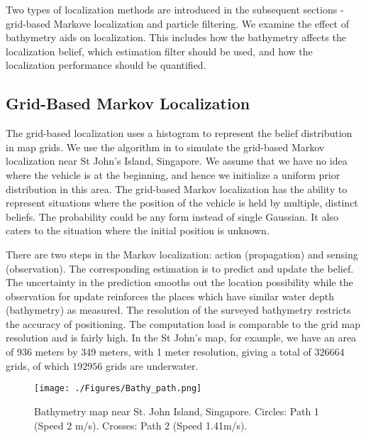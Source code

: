 Two types of localization methods are introduced in the subsequent sections - grid-based Markove localization and particle filtering. We examine the effect of bathymetry aids on localization. This includes how the bathymetry affects the localization belief, which estimation filter should be used, and how the localization performance should be quantified. %

\subsection{Grid-Based Markov Localization}

The grid-based localization uses a histogram to represent the belief distribution in map grids. We use the algorithm in \cite{dieter1999} to simulate the grid-based Markov localization near St John's Island, Singapore. We assume that we have no idea where the vehicle is at the beginning, and hence we initialize a uniform prior distribution in this area. The grid-based Markov localization has the ability to represent situations where the position of the vehicle is held by multiple, distinct beliefs. The probability could be any form instead of single Gaussian. It also caters to the situation where the initial position is unknown.

There are two steps in the Markov localization: action (propagation) and sensing (observation). The corresponding estimation is to predict and update the belief. The uncertainty in the prediction smooths out the location possibility while the observation for update reinforces the places which have similar water depth (bathymetry) as measured. The resolution of the surveyed bathymetry restricts the accuracy of positioning. The computation load is comparable to the grid map resolution and is fairly high. In the St John's map, for example, we have an area of 936 meters by 349 meters, with 1 meter resolution, giving a total of $326664$ grids, of which $192956$ grids are underwater.

\begin{figure}[htbp]
\centering
    \texttt{[image: ./Figures/Bathy\_path.png]}
            \caption{Bathymetry map near St. John Island, Singapore. Circles: Path 1 (Speed 2 m/s). Crosses: Path 2 (Speed 1.41m/s).}
                        \label{fig:Bathy_path}
\end{figure}


